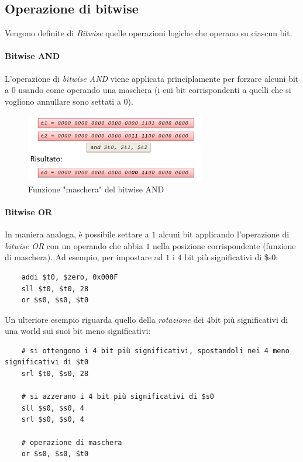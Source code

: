 \documentclass[class=book, crop=false]{standalone}
\begin{document}
\subsection{Operazione di bitwise}
Vengono definite di \emph{Bitwise} quelle operazioni logiche che operano su ciascun bit.

\paragraph{Bitwise AND}
L'operazione di \emph{bitwise AND} viene applicata principlamente per forzare alcuni bit a 0 usando come operando una maschera (i cui bit corrispondenti a quelli che si vogliono annullare sono settati a 0).
\begin{figure}[H]
	\centering
	\includegraphics[width=0.7\textwidth,keepaspectratio]{bitwise_and}
	\caption{Funzione "maschera" del bitwise AND}
\end{figure}

\paragraph{Bitwise OR}
In maniera analoga, è possibile settare a \(1\) alcuni bit applicando l'operazione di \emph{bitwise OR} con un operando che abbia \(1\) nella posizione corrispondente (funzione di maschera). Ad esempio, per impostare ad \(1\) i \(4\) bit più significativi di \$s0:
\begin{verbatim}
	addi $t0, $zero, 0x000F
	sll $t0, $t0, 28
	or $s0, $s0, $t0
\end{verbatim}

Un ulteriore esempio riguarda quello della \emph{rotazione} dei \(4\)bit più significativi di una world sui suoi bit meno significativi:
\begin{verbatim}
	# si ottengono i 4 bit più significativi, spostandoli nei 4 meno significativi di $t0
	srl $t0, $s0, 28

	# si azzerano i 4 bit più significativi di $s0
	sll $s0, $s0, 4
	srl $s0, $s0, 4

	# operazione di maschera
	or $s0, $s0, $t0
\end{verbatim}
\end{document}
